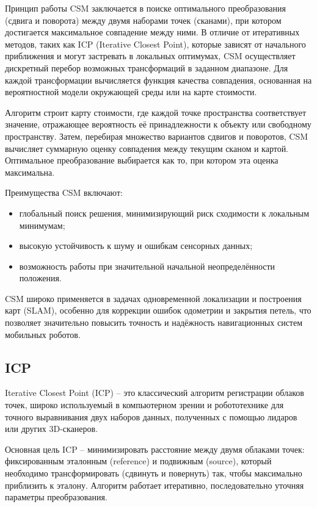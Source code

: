 Принцип работы CSM заключается в поиске оптимального преобразования (сдвига и поворота) между двумя наборами точек (сканами), при котором достигается максимальное совпадение между ними. В отличие от итеративных методов, таких как ICP (Iterative Closest Point), которые зависят от начального приближения и могут застревать в локальных оптимумах, CSM осуществляет дискретный перебор возможных трансформаций в заданном диапазоне. Для каждой трансформации вычисляется функция качества совпадения, основанная на вероятностной модели окружающей среды или на карте стоимости.

Алгоритм строит карту стоимости, где каждой точке пространства соответствует значение, отражающее вероятность её принадлежности к объекту или свободному пространству. Затем, перебирая множество вариантов сдвигов и поворотов, CSM вычисляет суммарную оценку совпадения между текущим сканом и картой. Оптимальное преобразование выбирается как то, при котором эта оценка максимальна.

Преимущества CSM включают:
\begin{itemize}
	\item глобальный поиск решения, минимизирующий риск сходимости к локальным минимумам;
	\item высокую устойчивость к шуму и ошибкам сенсорных данных;
	\item возможность работы при значительной начальной неопределённости положения.
\end{itemize}

CSM широко применяется в задачах одновременной локализации и построения карт (SLAM), особенно для коррекции ошибок одометрии и закрытия петель, что позволяет значительно повысить точность и надёжность навигационных систем мобильных роботов.

\subsection{ICP}
Iterative Closest Point (ICP) -- это классический алгоритм регистрации облаков
точек, широко используемый в компьютерном зрении и робототехнике для точного
выравнивания двух наборов данных, полученных с помощью лидаров или других
3D-сканеров.

Основная цель ICP -- минимизировать расстояние между двумя облаками точек:
фиксированным эталонным (reference) и подвижным (source), который необходимо
трансформировать (сдвинуть и повернуть) так, чтобы максимально приблизить к
эталону. Алгоритм работает итеративно, последовательно уточняя параметры
преобразования.

